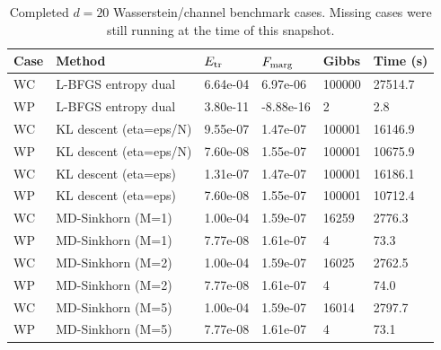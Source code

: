\begin{table}
\caption{Completed $d=20$ Wasserstein/channel benchmark cases. Missing cases were still running at the time of this snapshot.}
\label{tab:wasserstein-completed}
\begin{tabular}{llllll}
\toprule
Case & Method & $E_{\rm tr}$ & $F_{\rm marg}$ & Gibbs & Time (s) \\
\midrule
WC & L-BFGS entropy dual & 6.64e-04 & 6.97e-06 & 100000 & 27514.7 \\
WP & L-BFGS entropy dual & 3.80e-11 & -8.88e-16 & 2 & 2.8 \\
WC & KL descent (eta=eps/N) & 9.55e-07 & 1.47e-07 & 100001 & 16146.9 \\
WP & KL descent (eta=eps/N) & 7.60e-08 & 1.55e-07 & 100001 & 10675.9 \\
WC & KL descent (eta=eps) & 1.31e-07 & 1.47e-07 & 100001 & 16186.1 \\
WP & KL descent (eta=eps) & 7.60e-08 & 1.55e-07 & 100001 & 10712.4 \\
WC & MD-Sinkhorn (M=1) & 1.00e-04 & 1.59e-07 & 16259 & 2776.3 \\
WP & MD-Sinkhorn (M=1) & 7.77e-08 & 1.61e-07 & 4 & 73.3 \\
WC & MD-Sinkhorn (M=2) & 1.00e-04 & 1.59e-07 & 16025 & 2762.5 \\
WP & MD-Sinkhorn (M=2) & 7.77e-08 & 1.61e-07 & 4 & 74.0 \\
WC & MD-Sinkhorn (M=5) & 1.00e-04 & 1.59e-07 & 16014 & 2797.7 \\
WP & MD-Sinkhorn (M=5) & 7.77e-08 & 1.61e-07 & 4 & 73.1 \\
\bottomrule
\end{tabular}
\end{table}
